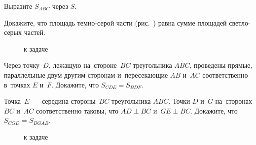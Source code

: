 \begin{problems}

\item
Выразите $S_{ABC}$ через $S$.
\begin{center}
\hfill
\hfill
\hfill
\hfill
\null\par
\hfill
\hfill
\hfill
\null
\end{center}



\item{}%
Докажите, что площадь темно-серой части
(рис.~)
равна сумме площадей светло-серых частей.

\begin{figure}[ht]
\begin{center}
    \caption{к задаче~}
\end{center}
\end{figure}

\item
Через точку~$D$, лежащую на~стороне~$BC$ треугольника $ABC$, проведены прямые,
параллельные двум другим сторонам и~пересекающие $AB$ и~$AC$ соответственно
в~точках $E$ и~$F$.
Докажите, что $S_{CDE} = S_{BDF}$.

\item
Точка~$E$~--- середина стороны~$BC$ треугольника $ABC$.
Точки $D$ и~$G$ на~сторонах $BC$ и~$AC$ соответственно таковы, что
$AD \perp BC$ и~$GE \perp BC$.
Докажите, что $S_{CGD} = S_{DGAB}$.

\begin{figure}[ht]
\begin{center}
    \caption{к задаче~}
\end{center}
\end{figure}


\end{problems}
